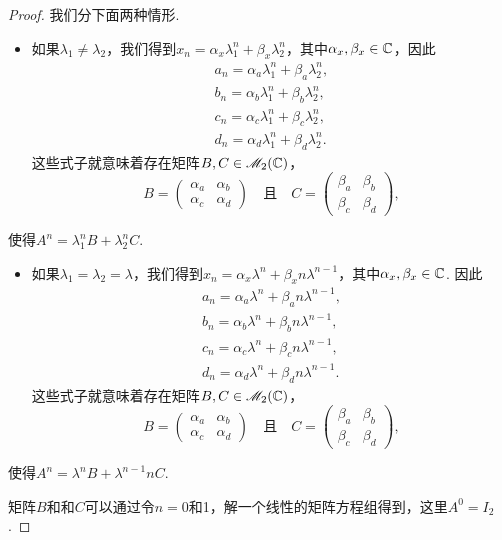 \begin{proof}
  我们分下面两种情形.
  \begin{itemize}
    \item 如果$\lambda_1\ne\lambda_2$，我们得到$x_n=\alpha_x\lambda_1^n+\beta_x\lambda_2^n$，其中$\alpha_x,\beta_x\in\mathbb C$，因此
        \begin{gather*}
          a_n = \alpha_a\lambda_1^n + \beta_a\lambda_2^n, \\
          b_n = \alpha_b\lambda_1^n + \beta_b\lambda_2^n, \\
          c_n = \alpha_c\lambda_1^n + \beta_c\lambda_2^n, \\
          d_n = \alpha_d\lambda_1^n + \beta_d\lambda_2^n.
        \end{gather*}
        这些式子就意味着存在矩阵$B,C\in\mathscr M_2(\mathbb C)$，
        \[
          B = \begin{pmatrix}
            \alpha_a & \alpha_b \\
            \alpha_c & \alpha_d
          \end{pmatrix} \quad \text{且} \quad
          C = \begin{pmatrix}
            \beta_a & \beta_b \\
            \beta_c & \beta_d
          \end{pmatrix},
        \]
  \end{itemize}
  使得$A^n=\lambda_1^nB+\lambda_2^nC$.
  \begin{itemize}
    \item 如果$\lambda_1=\lambda_2=\lambda$，我们得到$x_n=\alpha_x\lambda^n+\beta_xn\lambda^{n-1} $，其中$\alpha_x,\beta_x\in\mathbb C$. 因此
        \begin{gather*}
          a_n = \alpha_a\lambda^n + \beta_an\lambda^{n-1}, \\
          b_n = \alpha_b\lambda^n + \beta_bn\lambda^{n-1}, \\
          c_n = \alpha_c\lambda^n + \beta_cn\lambda^{n-1}, \\
          d_n = \alpha_d\lambda^n + \beta_dn\lambda^{n-1}.
        \end{gather*}
        这些式子就意味着存在矩阵$B,C\in\mathscr M_2(\mathbb C)$，
        \[
          B = \begin{pmatrix}
            \alpha_a & \alpha_b \\
            \alpha_c & \alpha_d
          \end{pmatrix} \quad \text{且} \quad
          C = \begin{pmatrix}
            \beta_a & \beta_b \\
            \beta_c & \beta_d
          \end{pmatrix},
        \]
  \end{itemize}
  使得$A^n=\lambda^nB+\lambda^{n-1}nC$.

  矩阵$B$和和$C$可以通过令$n=0$和1，解一个线性的矩阵方程组得到，这里$A^0=I_2$.
\end{proof}

